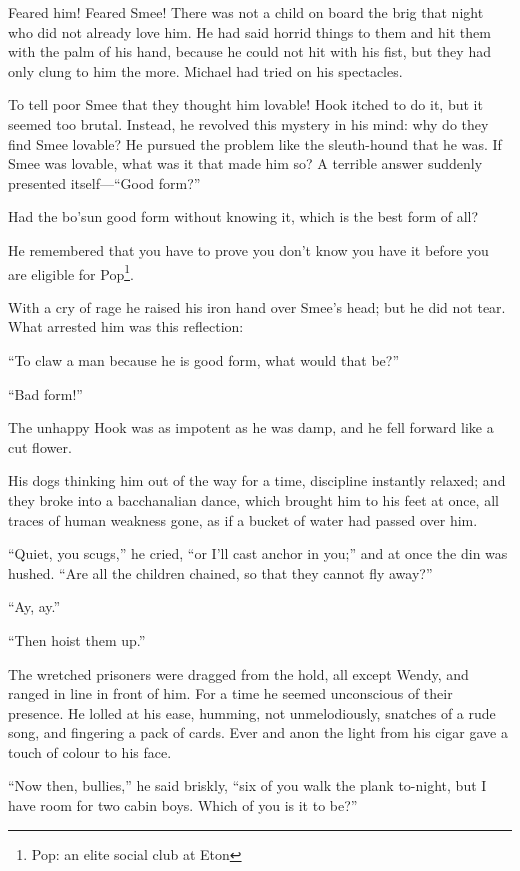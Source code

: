Feared him!
Feared Smee!
There was not a child on board the brig that night who did not already love him.
He had said horrid things to them and hit them with the palm of his hand, because he could not hit with his fist,
but they had only clung to him the more.
Michael had tried on his spectacles.

To tell poor Smee that they thought him lovable!
Hook itched to do it, but it seemed too brutal.
Instead, he revolved this mystery in his mind:
why do they find Smee lovable?
He pursued the problem like the sleuth-hound that he was.
If Smee was lovable, what was it that made him so?
A terrible answer suddenly presented itself—“Good form?”

Had the bo’sun good form without knowing it, which is the best form of all?

He remembered that you have to prove you don’t know you have it
before you are eligible for Pop\footnote{Pop: an elite social club at Eton}.

With a cry of rage he raised his iron hand over Smee’s head;
but he did not tear.
What arrested him was this reflection:

“To claw a man because he is good form, what would that be?”

“Bad form!”

The unhappy Hook was as impotent as he was damp, and he fell forward like a cut flower.

His dogs thinking him out of the way for a time, discipline instantly relaxed;
and they broke into a bacchanalian dance,
which brought him to his feet at once, all traces of human weakness gone,
as if a bucket of water had passed over him.

“Quiet, you scugs,” he cried, “or I’ll cast anchor in you;”
and at once the din was hushed.
“Are all the children chained, so that they cannot fly away?”

“Ay, ay.”

“Then hoist them up.”

The wretched prisoners were dragged from the hold, all except Wendy,
and ranged in line in front of him.
For a time he seemed unconscious of their presence.
He lolled at his ease, humming, not unmelodiously, snatches of a rude song,
and fingering a pack of cards.
Ever and anon the light from his cigar gave a touch of colour to his face.

“Now then, bullies,” he said briskly, “six of you walk the plank to-night,
but I have room for two cabin boys.
Which of you is it to be?”

